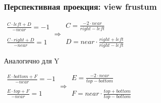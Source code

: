 \documentclass{beamer}
\begin{document}
\begin{frame}[fragile]
\frametitle{Перспективная проекция: view frustum}
\begin{center}
\begin{math}
\begin{matrix}
\frac{C\cdot left + D}{-near} = -1 \\ \\
\frac{C\cdot right + D}{-near} = 1
\end{matrix}
\Rightarrow
\begin{matrix}
C = \frac{-2\cdot near}{right - left} \\ \\
D = near \cdot \frac{right + left}{right - left}
\end{matrix}
\end{math}
\end{center}
\pause
Аналогично для Y
\begin{center}
\begin{math}
\begin{matrix}
\frac{E\cdot bottom + F}{-near} = -1 \\ \\
\frac{E\cdot top + F}{-near} = 1
\end{matrix}
\Rightarrow
\begin{matrix}
E = \frac{-2\cdot near}{top - bottom} \\ \\
F = near \cdot \frac{top + bottom}{top - bottom}
\end{matrix}
\end{math}
\end{center}
\end{frame}
\end{document}
